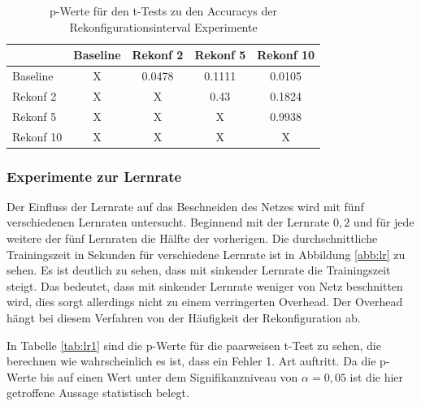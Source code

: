 \begin{table}[]
\caption{p-Werte für den t-Tests zu den Accuracys der Rekonfigurationsinterval Experimente}
\begin{tabular}{l|c|c|c|c|}
\cline{2-5}
                                & \multicolumn{1}{l|}{Baseline} & \multicolumn{1}{l|}{Rekonf 2}  & \multicolumn{1}{l|}{Rekonf 5}  & \multicolumn{1}{l|}{Rekonf 10} \\ \hline
\multicolumn{1}{|l|}{Baseline}  & X                             & \cellcolor[HTML]{FFFFFF}0.0478 & \cellcolor[HTML]{FE0000}0.1111 & \cellcolor[HTML]{FFFFFF}0.0105 \\ \hline
\multicolumn{1}{|l|}{Rekonf 2}  & X                             & X                              & \cellcolor[HTML]{FE0000}0.43   & \cellcolor[HTML]{FE0000}0.1824 \\ \hline
\multicolumn{1}{|l|}{Rekonf 5}  & X                             & X                              & X                              & \cellcolor[HTML]{FE0000}0.9938 \\ \hline
\multicolumn{1}{|l|}{Rekonf 10} & X                             & X                              & X                              & X                              \\ \hline
\end{tabular}
\label{tab:reconf2}
\end{table}
 
  
\subsubsection{Experimente zur Lernrate}
Der Einfluss der Lernrate auf das Beschneiden des Netzes wird mit fünf verschiedenen Lernraten untersucht. Beginnend mit der Lernrate $0,2$ und für jede weitere der fünf Lernraten die Hälfte der vorherigen.
Die durchschnittliche Trainingszeit in Sekunden für verschiedene Lernrate ist in Abbildung \ref{abb:lr} zu sehen. Es ist deutlich zu sehen, dass mit sinkender Lernrate die Trainingszeit steigt. Das bedeutet, dass mit sinkender Lernrate weniger von Netz beschnitten wird, dies sorgt allerdings nicht zu einem verringerten Overhead. Der Overhead hängt bei diesem Verfahren von der Häufigkeit der Rekonfiguration ab.


In Tabelle \ref{tab:lr1} sind die p-Werte für die paarweisen t-Test zu sehen, die berechnen wie wahrscheinlich es ist, dass ein Fehler 1. Art auftritt. Da die p-Werte bis auf einen Wert unter dem Signifikanzniveau von $\alpha = 0,05$ ist die hier getroffene Aussage statistisch belegt.


